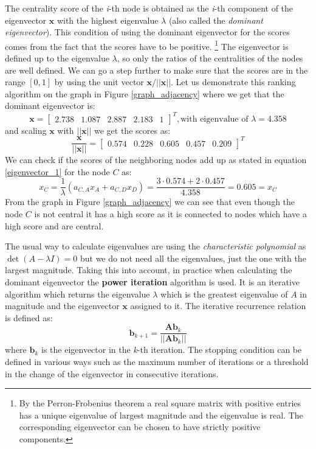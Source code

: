 \documentclass[12pt]{article}
\numberwithin{equation}{section}
\begin{document}
\begin{spacing}{1.5}
	The centrality score of the \textit{i}-th node is obtained as the \textit{i}-th component of the eigenvector $\mathbf{x}$ with the highest eigenvalue $\lambda$ (also called the \textit{dominant eigenvector}). This condition of using the dominant eigenvector for the scores comes from the fact that the scores have to be positive. \footnote{By the Perron-Frobenius theorem a real square matrix with positive entries has a unique eigenvalue of largest magnitude and the eigenvalue is real. The corresponding eigenvector can be chosen to have strictly positive components.} The eigenvector is defined up to the eigenvalue $\lambda$, so only the ratios of the centralities of the nodes are well defined. We can go a step further to make sure that the scores are in the range $[0, 1]$ by using the unit vector $\mathbf{x}/||\mathbf{x}||$. Let us demonstrate this ranking algorithm on the graph in Figure \ref{graph_adjacency} where we get that the dominant eigenvector is:
	$$ \mathbf{x} = 
	\begin{bmatrix}
		2.738 & 1.087 & 2.887 & 2.183 & 1
	\end{bmatrix}^{T}, \text{with eigenvalue of } \lambda = 4.358$$
	and scaling $\mathbf{x}$ with $||\mathbf{x}||$ we get the scores as:
	$$ \frac{\mathbf{x}}{||\mathbf{x}||} = \begin{bmatrix}
		0.574 & 0.228 & 0.605 & 0.457 & 0.209
	\end{bmatrix}^{T}$$ 
	We can check if the scores of the neighboring nodes add up as stated in equation \ref{eigenvector_1} for the node $C$ as:
	$$ x_C = \frac{1}{\lambda} (a_{C,A}x_A + a_{C, D}x_D) = \frac{3 \cdot 0.574 + 2 \cdot 0.457}{4.358} = 0.605 = x_C $$
	From the graph in Figure \ref{graph_adjacency} we can see that even though the node $C$ is not central it has a high score as it is connected to nodes which have a high score and are central. 
	
	The usual way to calculate eigenvalues are using the \textit{characteristic polynomial} as $\det(A-\lambda I) = 0$ but we do not need all the eigenvalues, just the one with the largest magnitude. Taking this into account, in practice when calculating the dominant eigenvector the \textbf{power iteration} algorithm is used. It is an iterative algorithm which returns the eigenvalue $\lambda$ which is the greatest eigenvalue of $A$ in magnitude and the eigenvector $\mathbf{x}$ assigned to it. The iterative recurrence relation is defined as:
	\begin{equation}
		\mathbf{b}_{k+1} = \frac{\mathbf{A}\mathbf{b}_{k}}{|| \mathbf{A}\mathbf{b}_{k}||}
	\end{equation}
	where $\mathbf{b}_{k}$ is the eigenvector in the \textit{k}-th iteration.
	The stopping condition can be defined in various ways such as the maximum number of iterations or a threshold in the change of the eigenvector in consecutive iterations.
	

\end{spacing}
\end{document}
